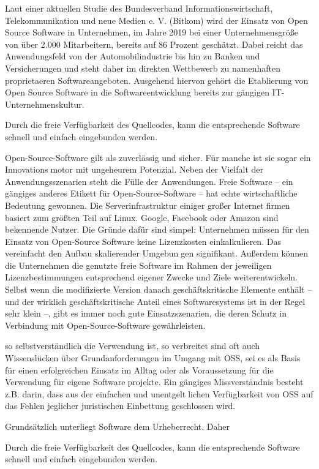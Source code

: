 Laut einer aktuellen Studie des Bundesverband Informationswirtschaft, Telekommunikation und neue Medien e. V. (Bitkom) wird der Einsatz von Open Source Software in Unternehmen, im Jahre 2019 bei einer Unternehmensgröße von über 2.000 Mitarbeitern, bereits auf 86 Prozent geschätzt. Dabei reicht das Anwendungsfeld von der Automobilindustrie bis hin zu Banken und Versicherungen und steht daher im direkten Wettbewerb zu namenhaften proprietaeren Softwareangeboten. Ausgehend hiervon gehört die Etablierung von Open Source Software in die Softwareentwicklung bereits zur gängigen IT-Unternehmenskultur.  

Durch die freie Verfügbarkeit des Quellcodes, kann die entsprechende Software schnell und einfach eingebunden werden. 



Open-Source-Software gilt als zuverlässig und sicher. Für manche ist sie sogar ein Innovationsmotor mit ungeheurem Potenzial. Neben der Vielfalt der Anwendungsszenarien steht die Fülle 
der Anwendungen. Freie Software – ein gängiges anderes Etikett für Open-Source-Software – 
hat echte wirtschaftliche Bedeutung gewonnen. Die Serverinfrastruktur einiger großer Internetfirmen basiert zum größten Teil auf Linux. Google, Facebook oder Amazon sind bekennende 
Nutzer. Die Gründe dafür sind simpel: Unternehmen müssen für den Einsatz von Open-SourceSoftware keine Lizenzkosten einkalkulieren. Das vereinfacht den Aufbau skalierender Umgebungen signifikant. Außerdem können die Unternehmen die genutzte freie Software im Rahmen 
der jeweiligen Lizenzbestimmungen entsprechend eigener Zwecke und Ziele weiterentwickeln. 
Selbst wenn die modifizierte Version danach geschäftskritische Elemente enthält – und der 
wirklich geschäftskritische Anteil eines Softwaresystems ist in der Regel sehr klein –, gibt es 
immer noch gute Einsatzszenarien, die deren Schutz in Verbindung mit Open-Source-Software 
gewährleisten.


so selbstverständlich die Verwendung ist, so verbreitet sind 
oft auch Wissenslücken über Grundanforderungen im Umgang mit OSS, sei es als Basis für einen 
erfolgreichen Einsatz im Alltag oder als Voraussetzung für die Verwendung für eigene Softwareprojekte. Ein gängiges Missverständnis besteht z.B. darin, dass aus der einfachen und unentgeltlichen Verfügbarkeit von OSS auf das Fehlen jeglicher juristischen Einbettung geschlossen wird. 

Grundsätzlich unterliegt Software dem Urheberrecht. Daher 

Durch die freie Verfügbarkeit des Quellcodes, kann die entsprechende Software schnell und einfach eingebunden werden. 


